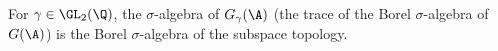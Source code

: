 For $\gamma\in\GL_2(\Q)$, the $\sigma$-algebra of $G_\gamma(\A)$ (the trace of the Borel $\sigma$-algebra of $G(\A)$) is the Borel
$\sigma$-algebra of the subspace topology.
